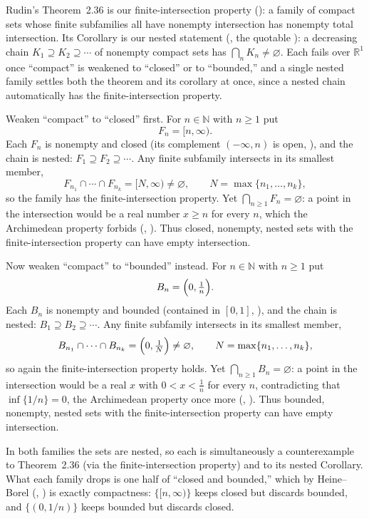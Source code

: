 \documentclass[main.tex]{subfiles}
\begin{document}
\begin{SolutionBlue}
Rudin's Theorem~2.36 is our finite-intersection property (): a family of compact sets
whose finite subfamilies all have nonempty intersection has nonempty total intersection. Its Corollary
is our nested statement (, the quotable ): a decreasing chain $K_1\supseteq K_2\supseteq\cdots$ of nonempty compact sets has
$\bigcap_n K_n\neq\varnothing$. Each fails over $\mathbb R^{1}$ once ``compact'' is weakened to
``closed'' or to ``bounded,'' and a single nested family settles both the theorem and its corollary at
once, since a nested chain automatically has the finite-intersection property.

Weaken ``compact'' to ``closed'' first. For $n\in\mathbb N$ with $n\ge 1$ put
\[
  F_n=[n,\infty).
\]
Each $F_n$ is nonempty and closed (its complement $(-\infty,n)$ is open, ), and the chain
is nested: $F_1\supseteq F_2\supseteq\cdots$. Any finite subfamily intersects in its smallest member,
\[
  F_{n_1}\cap\cdots\cap F_{n_k}=[N,\infty)\neq\varnothing,\qquad N=\max\{n_1,\dots,n_k\},
\]
so the family has the finite-intersection property. Yet $\bigcap_{n\ge 1}F_n=\varnothing$: a point in
the intersection would be a real number $x\ge n$ for every $n$, which the Archimedean property forbids
(, ). Thus closed, nonempty, nested sets
with the finite-intersection property can have empty intersection.

Now weaken ``compact'' to ``bounded'' instead. For $n\in\mathbb N$ with $n\ge 1$ put
\[
  B_n=\Bigl(0,\tfrac1n\Bigr).
\]
Each $B_n$ is nonempty and bounded (contained in $[0,1]$, ), and the chain is nested:
$B_1\supseteq B_2\supseteq\cdots$. Any finite subfamily intersects in its smallest member,
\[
  B_{n_1}\cap\cdots\cap B_{n_k}=\Bigl(0,\tfrac1N\Bigr)\neq\varnothing,\qquad N=\max\{n_1,\dots,n_k\},
\]
so again the finite-intersection property holds. Yet $\bigcap_{n\ge 1}B_n=\varnothing$: a point in the
intersection would be a real $x$ with $0<x<\tfrac1n$ for every $n$, contradicting that
$\inf\{1/n\}=0$, the Archimedean property once more (,
). Thus bounded, nonempty, nested sets with the finite-intersection property can have
empty intersection.

In both families the sets are nested, so each is simultaneously a counterexample to Theorem~2.36 (via
the finite-intersection property) and to its nested Corollary. What each family drops is one half of
``closed and bounded,'' which by Heine--Borel (, ) is exactly compactness: $\{[n,\infty)\}$ keeps closed but discards
bounded, and $\{(0,1/n)\}$ keeps bounded but discards closed.
\end{SolutionBlue}
\end{document}
